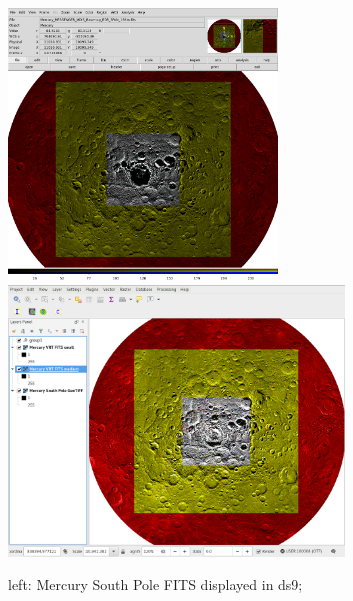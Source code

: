 \begin{figure}[ht!]
\centerline{\includegraphics[height=17pc]{ess_marmo2} \includegraphics[height=17pc]{ess_marmo1}}
\caption{left: Mercury South Pole FITS \DIFdelbeginFL {}\DIFdelendFL \DIFaddbeginFL {}\DIFaddendFL displayed in ds9\DIFaddbeginFL {}\DIFaddendFL ;
}
\end{figure}
